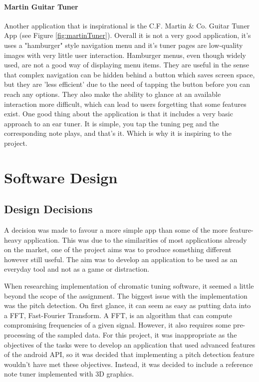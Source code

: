 \documentclass[conference]{acmsiggraph}
\begin{document}
\paragraph{Martin Guitar Tuner} Another application that is inspirational is the C.F. Martin \& Co. Guitar Tuner App (see Figure \ref{fig:martinTuner}). Overall it is not a very good application, it's uses a "hamburger" style navigation menu and it's tuner pages are low-quality images with very little user interaction. Hamburger menus, even though widely used, are not a good way of displaying menu items. They are useful in the sense that complex navigation can be hidden behind a button which saves screen space, but they are 'less efficient' due to the need of tapping the button before you can reach any options. They also make the ability to glance at an available interaction more difficult, which can lead to users forgetting that some features exist. \cite{hamburger} One good thing about the application is that it includes a very basic approach to an ear tuner. It is simple, you tap the tuning peg and the corresponding note plays, and that's it. Which is why it is inspiring to the project.


\section{Software Design}

\subsection{Design Decisions}

A decision was made to favour a more simple app than some of the more feature-heavy application. This was due to the similarities of most applications already on the market, one of the project aims was to produce something different however still useful. The aim was to develop an application to be used as an everyday tool and not as a game or distraction.

When researching implementation of chromatic tuning software, it seemed a little beyond the scope of the assignment. The biggest issue with the implementation was the pitch detection. On first glance, it can seem as easy as putting data into a FFT, Fast-Fourier Transform. A FFT, is an algorithm that can compute compromising frequencies of a given signal. \cite{FFT} However, it also requires some pre-processing of the sampled data. For this project, it was inappropriate as the objectives of the tasks were to develop an application that used advanced features of the android API, so it was decided that implementing a pitch detection feature wouldn't have met these objectives. Instead, it was decided to include a reference note tuner implemented with 3D graphics.
\end{document}
